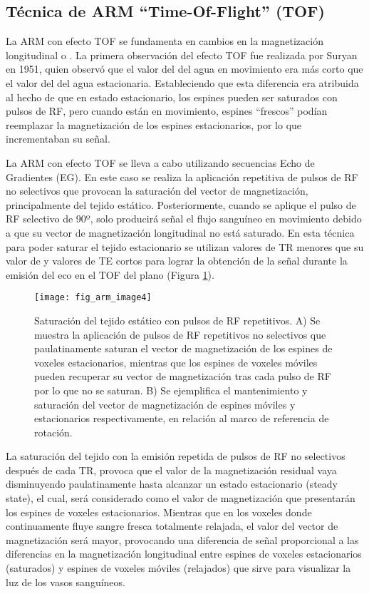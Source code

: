 \subsection{Técnica de ARM ``Time-Of-Flight''  (TOF) }

La ARM con efecto TOF se fundamenta en cambios en la magnetización longitudinal o \Tone. La primera observación del efecto TOF fue realizada por Suryan en 1951, quien observó que el valor del \Tone del agua en movimiento era más corto que el valor del \Tone del agua estacionaria. Estableciendo que esta diferencia era atribuida al hecho de que en estado estacionario, los espines pueden ser saturados con pulsos de RF, pero cuando están en movimiento, espines ``frescos'' podían reemplazar la magnetización de los espines estacionarios, por lo que incrementaban su señal. 

La ARM con efecto TOF se lleva a cabo utilizando secuencias Echo de Gradientes (EG). En este caso se realiza la aplicación repetitiva de pulsos de RF no selectivos que provocan la saturación del vector de magnetización, principalmente del tejido estático. Posteriormente, cuando se aplique el pulso de RF selectivo de 90º, solo producirá señal el flujo sanguíneo en movimiento debido a que su vector de magnetización longitudinal no está saturado. En esta técnica para poder saturar el tejido estacionario se utilizan valores de TR menores que su valor de \Tone y valores de TE cortos para lograr la obtención de la señal durante la emisión del eco en el TOF del plano (Figura \ref{fig:arm_image4}). 


\begin{figure}[htbp]
\begin{figg}
 \texttt{[image: fig\_arm\_image4]}
 \caption{
 Saturación del tejido estático con pulsos de RF repetitivos. A) Se muestra la aplicación de pulsos de RF repetitivos no selectivos que paulatinamente saturan el vector de magnetización de los espines de voxeles estacionarios, mientras que los espines de voxeles móviles pueden recuperar su vector de magnetización tras cada pulso de RF por lo que no se saturan. B) Se ejemplifica el mantenimiento y saturación del vector de magnetización de espines móviles y estacionarios respectivamente, en relación al marco de referencia de rotación. 
 }
 \label{fig:arm_image4}
\end{figg}
\end{figure}




La saturación del tejido con la emisión repetida de pulsos de RF no selectivos después de cada TR, provoca que el valor de la magnetización residual vaya disminuyendo paulatinamente hasta alcanzar un estado estacionario (steady state), el cual, será considerado como el valor de magnetización que presentarán los espines de voxeles estacionarios. Mientras que en los voxeles donde continuamente fluye sangre fresca totalmente relajada, el valor del vector de magnetización será mayor, provocando una diferencia de señal proporcional a las diferencias en la magnetización longitudinal entre espines de voxeles estacionarios (saturados) y espines de voxeles móviles (relajados) que sirve para visualizar la luz de los vasos sanguíneos.



